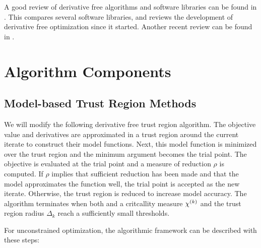 A good review of derivative free algorithms and software libraries can be found in \cite{DUMMY:review}.
This compares several software libraries, and reviews the development of derivative free optimization since it started.
Another recent review can be found in \cite{DUMMY:review2}.



\section{Algorithm Components}


\subsection{Model-based Trust Region Methods}

We will modify the following derivative free trust region algorithm.
The objective value and derivatives are approximated in a trust region around the current iterate to construct their model functions.
Next, this model function is minimized over the trust region and the minimum argument becomes the trial point.
The objective is evaluated at the trial point and a measure of reduction $\rho$ is computed.
If $\rho$ implies that sufficient reduction has been made and that the model approximates the function well, the trial point is accepted as the new iterate.
Otherwise, the trust region is reduced to increase model accuracy.
The algorithm terminates when both and a critcallity measure ${\chi^{(k)}}$ and the trust region radius $\Delta_k$ reach a sufficiently small thresholds.


For unconstrained optimization, the algorithmic framework can be described with these steps:

